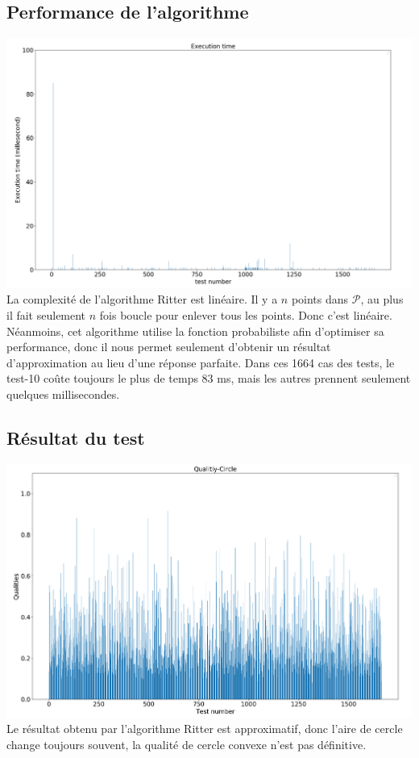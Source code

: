 \documentclass[14px]{article}
\begin{document}
\subsection{Performance de l'algorithme}
\includegraphics[width=\textwidth]{TestTime_Circle.png}\\
La complexité de l'algorithme Ritter est linéaire. Il y a $n$ points dans $\mathcal{P}$, au plus il fait seulement $n$ fois boucle pour enlever tous les points. Donc c'est linéaire. Néanmoins, cet algorithme utilise la fonction probabiliste afin d'optimiser sa performance, donc il nous permet seulement d'obtenir un résultat d’approximation au lieu d'une réponse parfaite.
Dans ces 1664 cas des tests, le test-10 coûte toujours le plus de temps 83 ms, mais les autres prennent seulement quelques millisecondes.

\subsection{Résultat du test}
\includegraphics[width=\textwidth]{testQuality_Circle.png}\\
Le résultat obtenu par l'algorithme Ritter est approximatif, donc l'aire de cercle change toujours souvent, la qualité de cercle convexe n'est pas définitive.
\end{document}
